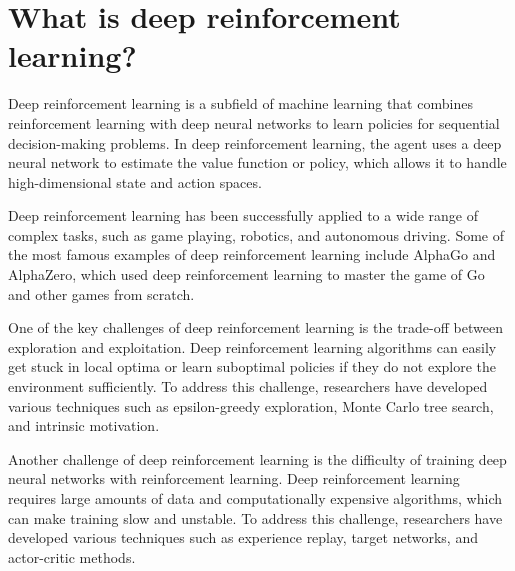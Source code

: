 \section{What is deep reinforcement learning?}
Deep reinforcement learning is a subfield of machine learning that combines reinforcement learning with deep neural networks to learn policies for sequential decision-making problems. In deep reinforcement learning, the agent uses a deep neural network to estimate the value function or policy, which allows it to handle high-dimensional state and action spaces.

Deep reinforcement learning has been successfully applied to a wide range of complex tasks, such as game playing, robotics, and autonomous driving. Some of the most famous examples of deep reinforcement learning include AlphaGo and AlphaZero, which used deep reinforcement learning to master the game of Go and other games from scratch.

One of the key challenges of deep reinforcement learning is the trade-off between exploration and exploitation. Deep reinforcement learning algorithms can easily get stuck in local optima or learn suboptimal policies if they do not explore the environment sufficiently. To address this challenge, researchers have developed various techniques such as epsilon-greedy exploration, Monte Carlo tree search, and intrinsic motivation.

Another challenge of deep reinforcement learning is the difficulty of training deep neural networks with reinforcement learning. Deep reinforcement learning requires large amounts of data and computationally expensive algorithms, which can make training slow and unstable. To address this challenge, researchers have developed various techniques such as experience replay, target networks, and actor-critic methods.


